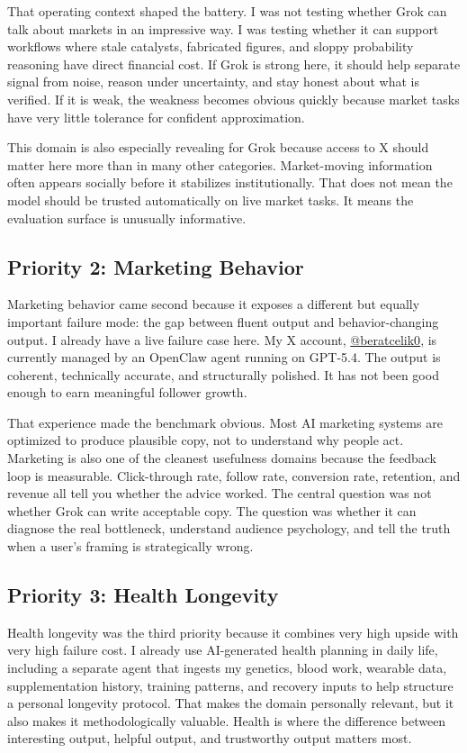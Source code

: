 \documentclass[11pt, a4paper]{article}
\begin{document}
That operating context shaped the battery. I was not testing whether Grok can talk about markets in an impressive way. I was testing whether it can support workflows where stale catalysts, fabricated figures, and sloppy probability reasoning have direct financial cost. If Grok is strong here, it should help separate signal from noise, reason under uncertainty, and stay honest about what is verified. If it is weak, the weakness becomes obvious quickly because market tasks have very little tolerance for confident approximation.

This domain is also especially revealing for Grok because access to X should matter here more than in many other categories. Market-moving information often appears socially before it stabilizes institutionally. That does not mean the model should be trusted automatically on live market tasks. It means the evaluation surface is unusually informative.

\subsection{Priority 2: Marketing Behavior}

Marketing behavior came second because it exposes a different but equally important failure mode: the gap between fluent output and behavior-changing output. I already have a live failure case here. My X account, \href{https://x.com/beratcelik0}{@beratcelik0}, is currently managed by an OpenClaw agent running on GPT-5.4. The output is coherent, technically accurate, and structurally polished. It has not been good enough to earn meaningful follower growth.

That experience made the benchmark obvious. Most AI marketing systems are optimized to produce plausible copy, not to understand why people act. Marketing is also one of the cleanest usefulness domains because the feedback loop is measurable. Click-through rate, follow rate, conversion rate, retention, and revenue all tell you whether the advice worked. The central question was not whether Grok can write acceptable copy. The question was whether it can diagnose the real bottleneck, understand audience psychology, and tell the truth when a user's framing is strategically wrong.

\subsection{Priority 3: Health Longevity}

Health longevity was the third priority because it combines very high upside with very high failure cost. I already use AI-generated health planning in daily life, including a separate agent that ingests my genetics, blood work, wearable data, supplementation history, training patterns, and recovery inputs to help structure a personal longevity protocol. That makes the domain personally relevant, but it also makes it methodologically valuable. Health is where the difference between interesting output, helpful output, and trustworthy output matters most.
\end{document}
